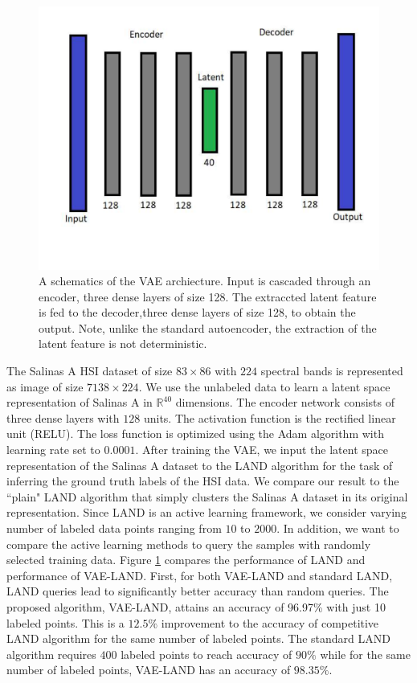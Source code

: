 \documentclass{article}
\def\R{{\mathbb R}}
\begin{document}
\begin{figure}[htb]
\includegraphics[clip,width=.45\textwidth,trim=1cm 3.5cm 1cm 1cm]{Images/VAE_Schematics.pdf}
\caption{\small{A schematics of the VAE archiecture. Input is cascaded through an encoder, three dense layers of size 128. The extraccted latent feature is fed to the decoder,three dense
layers of size 128, to obtain the output. Note, unlike the standard autoencoder, the extraction of the latent feature is not deterministic.   }}
\label{fig:SalinasA}
\end{figure}
The Salinas A HSI dataset of size $83 \times 86$ with $224$ spectral bands is represented as image of size $7138\times 224$. We use the unlabeled data to learn a latent space representation of Salinas A in $\R^{40}$ dimensions. The encoder network consists of three dense layers with $128$ units. The activation function is the rectified linear unit (RELU). The loss function is optimized using the Adam algorithm with learning rate set to $0.0001$. After training the VAE, we input the latent space representation of the Salinas A dataset to the LAND algorithm for the task of inferring the ground truth labels of the HSI data. We compare our result to the ``plain" LAND algorithm that simply clusters the Salinas A dataset in its original representation. Since LAND is an active learning framework, we consider varying number of labeled data points ranging from $10$ to $2000$. In addition, we want to compare the active learning methods to query the samples with randomly selected training data. Figure \ref{fig:SalinasA} compares the performance of LAND and performance of VAE-LAND. First, for both VAE-LAND and standard LAND, LAND queries lead to significantly better accuracy than random queries. The proposed algorithm, VAE-LAND, attains an accuracy of 96.97\% with just 10 labeled points. This is a $12.5\%$ improvement to the accuracy of competitive LAND algorithm for the same number of labeled points. The standard LAND algorithm requires $400$ labeled points to reach accuracy of $90\%$ while for the same number of labeled points, VAE-LAND has an accuracy of $98.35\%$. 
\end{document}
